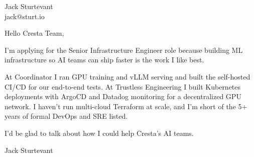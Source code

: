 \documentclass[11pt]{article}
\begin{document}
\raggedright

{\namefont\fontsize{20pt}{24pt}\selectfont Jack Sturtevant}\\[-0.3em]
jack@sturt.io

\vspace{1.2em}

Hello Cresta Team,

I'm applying for the Senior Infrastructure Engineer role because building ML infrastructure so AI teams can ship faster is the work I like best.

At Coordinator I ran GPU training and vLLM serving and built the self-hosted CI/CD for our end-to-end tests. At Trustless Engineering I built Kubernetes deployments with ArgoCD and Datadog monitoring for a decentralized GPU network. I haven't run multi-cloud Terraform at scale, and I'm short of the 5+ years of formal DevOps and SRE listed.

I'd be glad to talk about how I could help Cresta's AI teams.

\vspace{0.6em}
Jack Sturtevant
\end{document}
